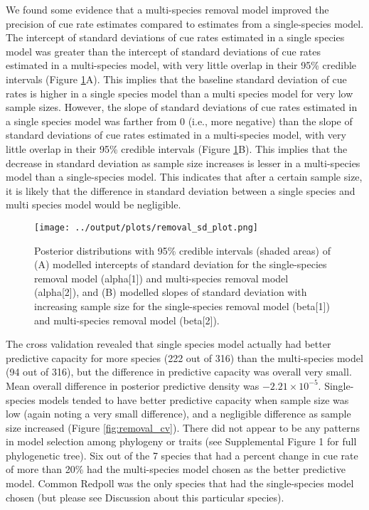 \documentclass[12pt]{article}
\begin{document}
\par We found some evidence that a multi-species removal model improved the precision of cue rate estimates compared to estimates from a single-species model.
The intercept of standard deviations of cue rates estimated in a single species model was greater than the intercept of standard deviations of cue rates estimated in a multi-species model, with very little overlap in their 95\% credible intervals (Figure \ref{fig:removal_sd}A).
This implies that the baseline standard deviation of cue rates is higher in a single species model than a multi species model for very low sample sizes.
However, the slope of standard deviations of cue rates estimated in a single species model was farther from 0 (i.e., more negative) than the slope of standard deviations of cue rates estimated in a multi-species model, with very little overlap in their 95\% credible intervals (Figure \ref{fig:removal_sd}B).
This implies that the decrease in standard deviation as sample size increases is lesser in a multi-species model than a single-species model.
This indicates that after a certain sample size, it is likely that the difference in standard deviation between a single species and multi species model would be negligible.

\begin{figure}[h!]
	\texttt{[image: ../output/plots/removal\_sd\_plot.png]}
	\caption{Posterior distributions with 95\% credible intervals (shaded areas) of (A) modelled intercepts of standard deviation for the single-species removal model (alpha[1]) and multi-species removal model (alpha[2]), and (B) modelled slopes of standard deviation with increasing sample size for the single-species removal model (beta[1]) and multi-species removal model (beta[2]).}
	\label{fig:removal_sd}
\end{figure}

\par The cross validation revealed that single species model actually had better predictive capacity for more species (222 out of 316) than the multi-species model (94 out of 316), but the difference in predictive capacity was overall very small.
Mean overall difference in posterior predictive density was $-2.21 \times 10^{-5}$.
Single-species models tended to have better predictive capacity when sample size was low (again noting a very small difference), and a negligible difference as sample size increased (Figure \ref{fig:removal_cv}).
There did not appear to be any patterns in model selection among phylogeny or traits (see Supplemental Figure 1 for full phylogenetic tree).
Six out of the 7 species that had a percent change in cue rate of more than 20\% had the multi-species model chosen as the better predictive model.
Common Redpoll was the only species that had the single-species model chosen (but please see Discussion about this particular species).
\end{document}
